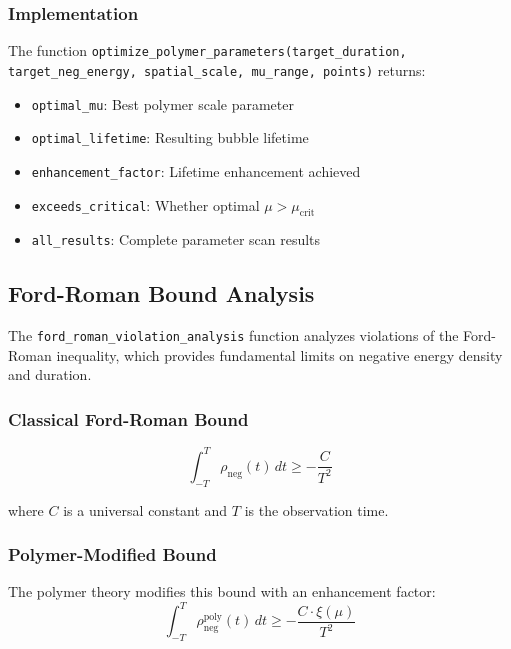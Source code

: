 \subsubsection{Implementation}

The function \texttt{optimize\_polymer\_parameters(target\_duration, target\_neg\_energy, spatial\_scale, mu\_range, points)} returns:

\begin{itemize}
\item \texttt{optimal\_mu}: Best polymer scale parameter
\item \texttt{optimal\_lifetime}: Resulting bubble lifetime
\item \texttt{enhancement\_factor}: Lifetime enhancement achieved
\item \texttt{exceeds\_critical}: Whether optimal $\mu > \mu_{\text{crit}}$
\item \texttt{all\_results}: Complete parameter scan results
\end{itemize}

\subsection{Ford-Roman Bound Analysis}

The \texttt{ford\_roman\_violation\_analysis} function analyzes violations of the Ford-Roman inequality, which provides fundamental limits on negative energy density and duration.

\subsubsection{Classical Ford-Roman Bound}

\begin{equation}
\int_{-T}^{T} \rho_{\text{neg}}(t) \, dt \geq -\frac{C}{T^2}
\end{equation}

where $C$ is a universal constant and $T$ is the observation time.

\subsubsection{Polymer-Modified Bound}

The polymer theory modifies this bound with an enhancement factor:
\begin{equation}
\int_{-T}^{T} \rho_{\text{neg}}^{\text{poly}}(t) \, dt \geq -\frac{C \cdot \xi(\mu)}{T^2}
\end{equation}

